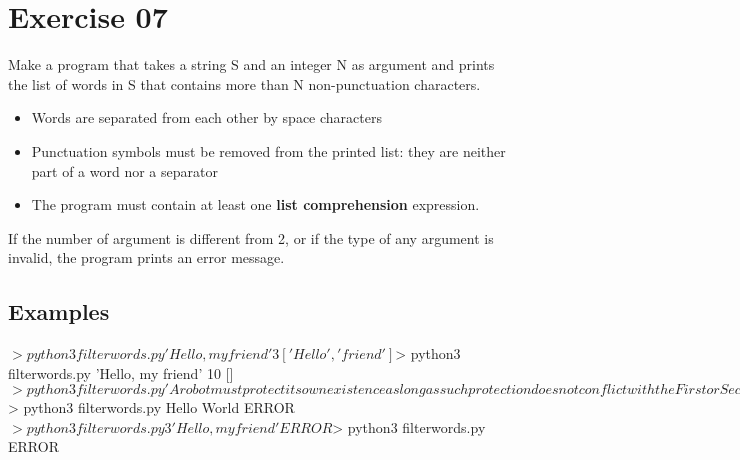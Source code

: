 \chapter{Exercise 07}
\makeheaderfilesforbidden
Make a program that takes a string S and an integer N as argument and prints the list of words in S that contains more than N non-punctuation characters.

\begin{itemize}
	\item Words are separated from each other by space characters
	\item Punctuation symbols must be removed from the printed list: they are neither part of a word nor a separator
	\item The program must contain at least one \textbf{list comprehension} expression. 
\end{itemize}
If the number of argument is different from 2, or if the type of any argument is invalid, the program prints an error message.

\section*{Examples}
\begin{42console}
$> python3 filterwords.py 'Hello, my friend' 3
['Hello', 'friend']
$> python3 filterwords.py 'Hello, my friend' 10
[]
$>  python3 filterwords.py 'A robot must protect its own existence as long as such protection does not conflict with the First or Second Law' 6
['protect', 'existence', 'protection', 'conflict']
$> python3 filterwords.py Hello World
ERROR
$> python3 filterwords.py 3 'Hello, my friend'
ERROR
$> python3 filterwords.py
ERROR
\end{42console}
    
